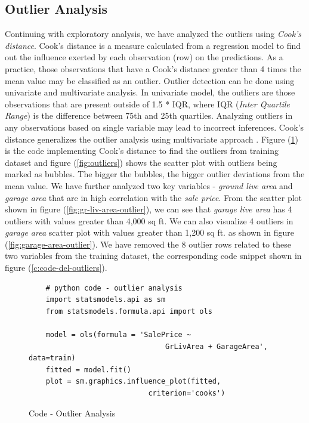 \documentclass[sigconf]{acmart}
\begin{document}
	\subsection{Outlier Analysis}
	
	Continuing with exploratory analysis, we have analyzed the outliers using {\em Cook's distance}. Cook's distance is a measure calculated from a regression model to find out the influence exerted by each observation (row) on the predictions. As a practice,  those observations that have a Cook's distance greater than 4 times the mean value may be classified as an outlier. Outlier detection can be done using univariate and multivariate analysis. In univariate model, the outliers are those observations that are present outside of 1.5 * IQR, where IQR ({\em Inter Quartile Range}) is the difference between 75th and 25th quartiles. Analyzing outliers in any observations based on single variable may lead to incorrect inferences. Cook's distance generalizes the outlier analysis using multivariate approach \cite{1}. Figure (\ref{c:code-outliers}) is the code implementing Cook's distance to find the outliers from training dataset and figure (\ref{fig:outliers}) shows the scatter plot with outliers being marked as bubbles. The bigger the bubbles, the bigger outlier deviations from the mean value. We have further analyzed two key variables - {\em ground live area} and {\em garage area} that are in high correlation with the {\em sale price}. From the scatter plot shown in figure (\ref{fig:gr-liv-area-outlier}), we can see that {\em garage live area} has 4 outliers with values greater than 4,000 sq ft. We can also visualize 4 outliers in {\em garage area} scatter plot with values greater than 1,200 sq ft. as shown in figure (\ref{fig:garage-area-outlier}).  We have removed the 8 outlier rows related to these two variables from the training dataset, the corresponding code snippet shown in figure (\ref{c:code-del-outliers}).
	
	\begin{figure}[htb]		
	\begin{verbatim}	
	# python code - outlier analysis
	import statsmodels.api as sm
	from statsmodels.formula.api import ols
	
	model = ols(formula = 'SalePrice ~ 
								GrLivArea + GarageArea', data=train)
	fitted = model.fit()    	
	plot = sm.graphics.influence_plot(fitted, 
							criterion='cooks')		
	\end{verbatim}
	\caption{Code - Outlier Analysis} \label{c:code-outliers} 
	\end{figure}
\end{document}

